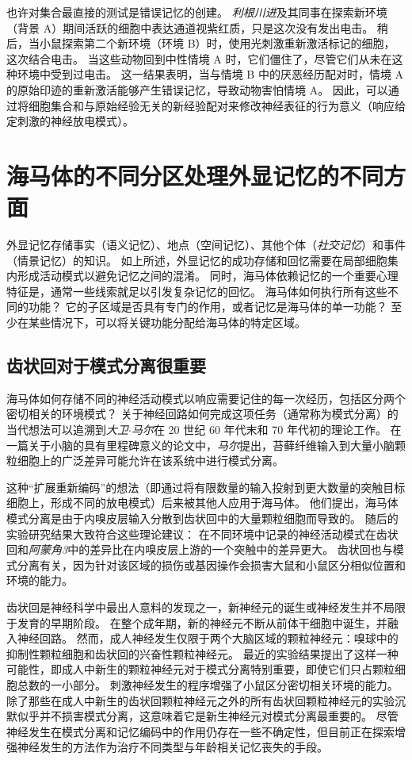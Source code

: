 也许对集合最直接的测试是错误记忆的创建。
\textit{利根川进}及其同事在探索新环境（背景 A）期间活跃的细胞中表达通道视紫红质，只是这次没有发出电击。
稍后，当小鼠探索第二个新环境（环境 B）时，使用光刺激重新激活标记的细胞，这次结合电击。
当这些动物回到中性情境 A 时，它们僵住了，尽管它们从未在这种环境中受到过电击。
这一结果表明，当与情境 B 中的厌恶经历配对时，情境 A 的原始印迹的重新激活能够产生错误记忆，导致动物害怕情境 A。
因此，可以通过将细胞集合和与原始经验无关的新经验配对来修改神经表征的行为意义（响应给定刺激的神经放电模式）。



\section{海马体的不同分区处理外显记忆的不同方面}

外显记忆存储事实（语义记忆）、地点（空间记忆）、其他个体（\textit{社交记忆}）和事件（情景记忆）的知识。
如上所述，外显记忆的成功存储和回忆需要在局部细胞集内形成活动模式以避免记忆之间的混淆。
同时，海马体依赖记忆的一个重要心理特征是，通常一些线索就足以引发复杂记忆的回忆。
海马体如何执行所有这些不同的功能？
它的子区域是否具有专门的作用，或者记忆是海马体的单一功能？
至少在某些情况下，可以将关键功能分配给海马体的特定区域。



\subsection{齿状回对于模式分离很重要}

海马体如何存储不同的神经活动模式以响应需要记住的每一次经历，包括区分两个密切相关的环境模式？
关于神经回路如何完成这项任务（通常称为模式分离）的当代想法可以追溯到\textit{大卫$\cdot$马尔}在 20 世纪 60 年代末和 70 年代初的理论工作。
在一篇关于小脑的具有里程碑意义的论文中，\textit{马尔}提出，苔藓纤维输入到大量小脑颗粒细胞上的广泛差异可能允许在该系统中进行模式分离。


这种“扩展重新编码”的想法（即通过将有限数量的输入投射到更大数量的突触目标细胞上，形成不同的放电模式）后来被其他人应用于海马体。
他们提出，海马体模式分离是由于内嗅皮层输入分散到齿状回中的大量颗粒细胞而导致的。
随后的实验研究结果大致符合这些理论建议：
在不同环境中记录的神经活动模式在齿状回和\textit{阿蒙角3}中的差异比在内嗅皮层上游的一个突触中的差异更大。
齿状回也与模式分离有关，因为针对该区域的损伤或基因操作会损害大鼠和小鼠区分相似位置和环境的能力。


齿状回是神经科学中最出人意料的发现之一，新神经元的诞生或神经发生并不局限于发育的早期阶段。
在整个成年期，新的神经元不断从前体干细胞中诞生，并融入神经回路。
然而，成人神经发生仅限于两个大脑区域的颗粒神经元：嗅球中的抑制性颗粒细胞和齿状回的兴奋性颗粒神经元。
最近的实验结果提出了这样一种可能性，即成人中新生的颗粒神经元对于模式分离特别重要，即使它们只占颗粒细胞总数的一小部分。
刺激神经发生的程序增强了小鼠区分密切相关环境的能力。
除了那些在成人中新生的齿状回颗粒神经元之外的所有齿状回颗粒神经元的实验沉默似乎并不损害模式分离，这意味着它是新生神经元对模式分离最重要的。
尽管神经发生在模式分离和记忆编码中的作用仍存在一些不确定性，但目前正在探索增强神经发生的方法作为治疗不同类型与年龄相关记忆丧失的手段。



